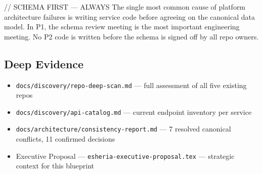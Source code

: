 \documentclass[10pt, a4paper]{article}
\newcommand{\code}[1]{{\monofont\color{TealDk}\small\texttt{#1}}}
\begin{document}
\medskip

\begin{warnbox}{// SCHEMA FIRST — ALWAYS}
The single most common cause of platform architecture failures is writing service code before
agreeing on the canonical data model. In P1, the schema review meeting is the most important
engineering meeting. No P2 code is written before the schema is signed off by all repo owners.
\end{warnbox}

\medskip

\subsection{Deep Evidence}

\begin{itemize}
  \item \code{docs/discovery/repo-deep-scan.md} — full assessment of all five existing repos
  \item \code{docs/discovery/api-catalog.md} — current endpoint inventory per service
  \item \code{docs/architecture/consistency-report.md} — 7 resolved canonical conflicts, 11 confirmed decisions
  \item Executive Proposal — \code{esheria-executive-proposal.tex} — strategic context for this blueprint
\end{itemize}
\end{document}
